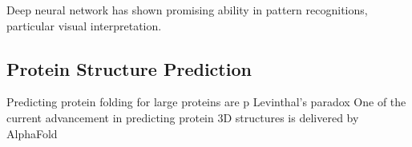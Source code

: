 Deep neural network has shown promising ability in pattern recognitions, particular visual interpretation.
\par 

\subsection{Protein Structure Prediction}
Predicting protein folding for large proteins are p Levinthal's paradox One of the current advancement in predicting protein 3D structures is delivered by AlphaFold